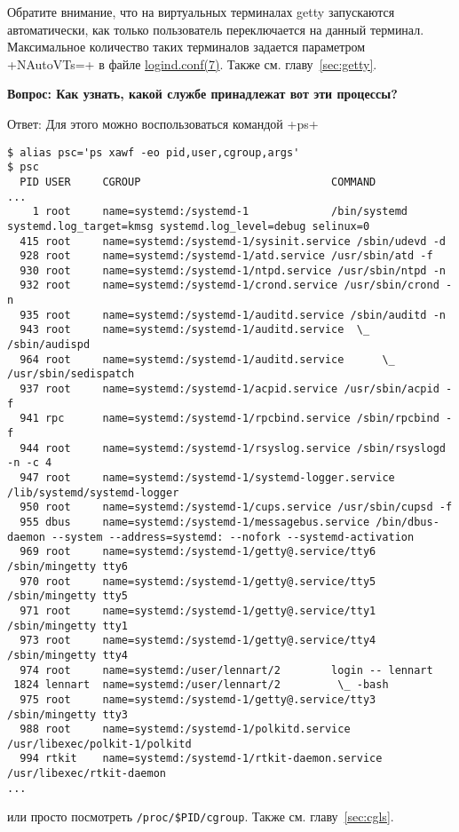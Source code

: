 \documentclass[10pt,oneside,a4paper]{article}
\newcommand{\qna}[1]{\medskip\par\textbf{Вопрос: #1}\nopagebreak\par Ответ:}
\begin{document}
Обратите внимание, что на виртуальных терминалах getty запускаются
автоматически, как только пользователь переключается на данный терминал.
Максимальное количество таких терминалов задается параметром +NAutoVTs=+ в файле
\href{http://www.freedesktop.org/software/systemd/man/logind.html}%
{logind.conf(7)}. Также см. главу~\ref{sec:getty}.

\qna{Как узнать, какой службе принадлежат вот эти процессы?}
Для этого можно воспользоваться командой +ps+
\begin{Verbatim}[fontsize=\small]
$ alias psc='ps xawf -eo pid,user,cgroup,args'
$ psc
  PID USER     CGROUP                              COMMAND
...
    1 root     name=systemd:/systemd-1             /bin/systemd systemd.log_target=kmsg systemd.log_level=debug selinux=0
  415 root     name=systemd:/systemd-1/sysinit.service /sbin/udevd -d
  928 root     name=systemd:/systemd-1/atd.service /usr/sbin/atd -f
  930 root     name=systemd:/systemd-1/ntpd.service /usr/sbin/ntpd -n
  932 root     name=systemd:/systemd-1/crond.service /usr/sbin/crond -n
  935 root     name=systemd:/systemd-1/auditd.service /sbin/auditd -n
  943 root     name=systemd:/systemd-1/auditd.service  \_ /sbin/audispd
  964 root     name=systemd:/systemd-1/auditd.service      \_ /usr/sbin/sedispatch
  937 root     name=systemd:/systemd-1/acpid.service /usr/sbin/acpid -f
  941 rpc      name=systemd:/systemd-1/rpcbind.service /sbin/rpcbind -f
  944 root     name=systemd:/systemd-1/rsyslog.service /sbin/rsyslogd -n -c 4
  947 root     name=systemd:/systemd-1/systemd-logger.service /lib/systemd/systemd-logger
  950 root     name=systemd:/systemd-1/cups.service /usr/sbin/cupsd -f
  955 dbus     name=systemd:/systemd-1/messagebus.service /bin/dbus-daemon --system --address=systemd: --nofork --systemd-activation
  969 root     name=systemd:/systemd-1/getty@.service/tty6 /sbin/mingetty tty6
  970 root     name=systemd:/systemd-1/getty@.service/tty5 /sbin/mingetty tty5
  971 root     name=systemd:/systemd-1/getty@.service/tty1 /sbin/mingetty tty1
  973 root     name=systemd:/systemd-1/getty@.service/tty4 /sbin/mingetty tty4
  974 root     name=systemd:/user/lennart/2        login -- lennart     
 1824 lennart  name=systemd:/user/lennart/2         \_ -bash
  975 root     name=systemd:/systemd-1/getty@.service/tty3 /sbin/mingetty tty3
  988 root     name=systemd:/systemd-1/polkitd.service /usr/libexec/polkit-1/polkitd
  994 rtkit    name=systemd:/systemd-1/rtkit-daemon.service /usr/libexec/rtkit-daemon
...
\end{Verbatim}
или просто посмотреть \verb+/proc/$PID/cgroup+. Также см. главу~\ref{sec:cgls}.
\end{document}
